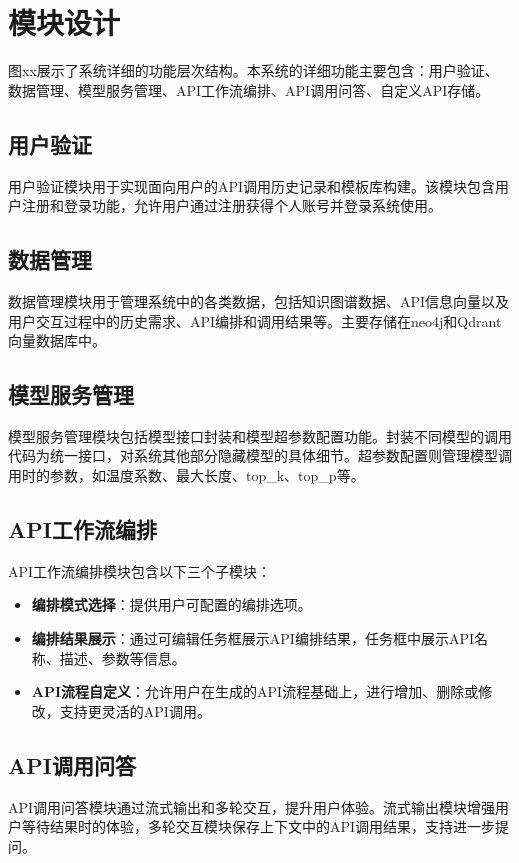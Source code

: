 \section{模块设计}

图xx展示了系统详细的功能层次结构。本系统的详细功能主要包含：用户验证、数据管理、模型服务管理、API工作流编排、API调用问答、自定义API存储。

\subsection{用户验证}
用户验证模块用于实现面向用户的API调用历史记录和模板库构建。该模块包含用户注册和登录功能，允许用户通过注册获得个人账号并登录系统使用。

\subsection{数据管理}
数据管理模块用于管理系统中的各类数据，包括知识图谱数据、API信息向量以及用户交互过程中的历史需求、API编排和调用结果等。主要存储在neo4j和Qdrant向量数据库中。

\subsection{模型服务管理}
模型服务管理模块包括模型接口封装和模型超参数配置功能。封装不同模型的调用代码为统一接口，对系统其他部分隐藏模型的具体细节。超参数配置则管理模型调用时的参数，如温度系数、最大长度、top\_k、top\_p等。

\subsection{API工作流编排}
API工作流编排模块包含以下三个子模块：
\begin{itemize}
    \item \textbf{编排模式选择}：提供用户可配置的编排选项。
    \item \textbf{编排结果展示}：通过可编辑任务框展示API编排结果，任务框中展示API名称、描述、参数等信息。
    \item \textbf{API流程自定义}：允许用户在生成的API流程基础上，进行增加、删除或修改，支持更灵活的API调用。
\end{itemize}

\subsection{API调用问答}
API调用问答模块通过流式输出和多轮交互，提升用户体验。流式输出模块增强用户等待结果时的体验，多轮交互模块保存上下文中的API调用结果，支持进一步提问。

